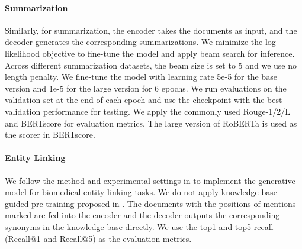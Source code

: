 \documentclass[11pt]{article}
\begin{document}
\paragraph{Summarization}
Similarly, for summarization, the encoder takes the documents as input, and the decoder generates the corresponding summarizations. We minimize the log-likelihood objective to fine-tune the model and apply beam search for inference. Across different summarization datasets, the beam size is set to 5 and we use no length penalty. We fine-tune the model with learning rate 5e-5 for the base version and 1e-5 for the large version for 6 epochs. We run evaluations on the validation set at the end of each epoch and use the checkpoint with the best validation performance for testing. We apply the commonly used Rouge-1/2/L and BERTscore for evaluation metrics. The large version of RoBERTa is used as the scorer in BERTscore.

\paragraph{Entity Linking} We follow the method and experimental settings in \citet{oursnaaclshort} to implement the generative model for biomedical entity linking tasks. We do not apply knowledge-base guided pre-training proposed in \citet{oursnaaclshort}. The documents with the positions of mentions marked are fed into the encoder and the decoder outputs the corresponding synonyms in the knowledge base directly. We use the top1 and top5 recall (Recall@1 and Recall@5) as the evaluation metrics.
\end{document}

